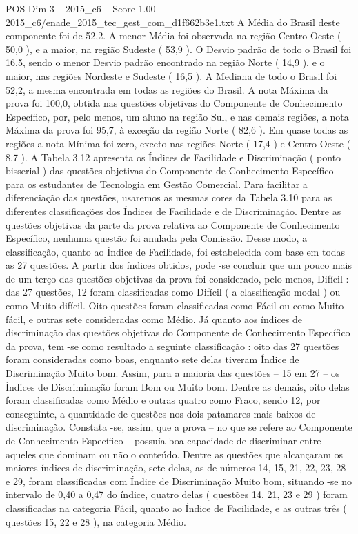 \begin{textsample}{POS Dim 3 – 2015\_c6 – Score 1.00 – 2015\_c6/enade\_2015\_tec\_gest\_com\_d1f662b3e1.txt}
A Média do Brasil deste componente foi de 52,2.
A menor Média foi observada na região Centro-Oeste ( 50,0 ), e a maior, na região Sudeste ( 53,9 ).
O Desvio padrão de todo o Brasil foi 16,5, sendo o menor Desvio padrão encontrado na região Norte ( 14,9 ), e o maior, nas regiões Nordeste e Sudeste ( 16,5 ).
A Mediana de todo o Brasil foi 52,2, a mesma encontrada em todas as regiões do Brasil.
A nota Máxima da prova foi 100,0, obtida nas questões objetivas do Componente de Conhecimento Específico, por, pelo menos, um aluno na região Sul, e nas demais regiões, a nota Máxima da prova foi 95,7, à exceção da região Norte ( 82,6 ).
Em quase todas as regiões a nota Mínima foi zero, exceto nas regiões Norte ( 17,4 ) e Centro-Oeste ( 8,7 ).
A Tabela 3.12 apresenta os Índices de Facilidade e Discriminação ( ponto bisserial ) das questões objetivas do Componente de Conhecimento Específico para os estudantes de Tecnologia em Gestão Comercial.
Para facilitar a diferenciação das questões, usaremos as mesmas cores da Tabela 3.10 para as diferentes classificações dos Índices de Facilidade e de Discriminação.
Dentre as questões objetivas da parte da prova relativa ao Componente de Conhecimento Específico, nenhuma questão foi anulada pela Comissão.
Desse modo, a classificação, quanto ao Índice de Facilidade, foi estabelecida com base em todas as 27 questões.
A partir dos índices obtidos, pode -se concluir que um pouco mais de um terço das questões objetivas da prova foi considerado, pelo menos, Difícil : das 27 questões, 12 foram classificadas como Difícil ( a classificação modal ) ou como Muito difícil.
Oito questões foram classificadas como Fácil ou como Muito fácil, e outras sete consideradas como Médio.
Já quanto aos índices de discriminação das questões objetivas do Componente de Conhecimento Específico da prova, tem -se como resultado a seguinte classificação : oito das 27 questões foram consideradas como boas, enquanto sete delas tiveram Índice de Discriminação Muito bom.
Assim, para a maioria das questões – 15 em 27 – os Índices de Discriminação foram Bom ou Muito bom.
Dentre as demais, oito delas foram classificadas como Médio e outras quatro como Fraco, sendo 12, por conseguinte, a quantidade de questões nos dois patamares mais baixos de discriminação.
Constata -se, assim, que a prova – no que se refere ao Componente de Conhecimento Específico – possuía boa capacidade de discriminar entre aqueles que dominam ou não o conteúdo.
Dentre as questões que alcançaram os maiores índices de discriminação, sete delas, as de números 14, 15, 21, 22, 23, 28 e 29, foram classificadas com Índice de Discriminação Muito bom, situando -se no intervalo de 0,40 a 0,47 do índice, quatro delas ( questões 14, 21, 23 e 29 ) foram classificadas na categoria Fácil, quanto ao Índice de Facilidade, e as outras três ( questões 15, 22 e 28 ), na categoria Médio.

\end{textsample}
